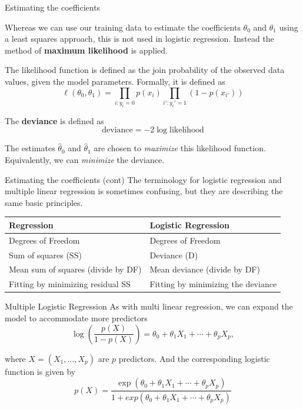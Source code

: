 \documentclass{beamer}
\begin{document}
\begin{frame}{Estimating the coefficients}
	
	Whereas we can use our training data to estimate the coefficients $\theta_0$ and $\theta_1$ using a least squares approach, this is not used in logistic regression. Instead the method of {\bf maximum likelihood} is applied. 
	
	The likelihood function is defined as the join probability of the observed data values, given the model parameters. Formally, it is defined as
	\begin{equation*}
		\ell (\theta_0,\theta_1)= \prod_{i:y_i=0} p(x_i) \prod_{i':y_i'=1} (1-p(x_{i'}))
	\end{equation*}	

The \textbf{deviance} is defined as 
\begin{equation*}
	\text{deviance}=-2 \log \text{likelihood}
\end{equation*}

The estimates $\hat{\theta}_0$ and $\hat{\theta}_1$  are chosen to {\it maximize} this likelihood function. Equivalently, we can \textit{minimize} the deviance.


\end{frame}		
\begin{frame}{Estimating the coefficients (cont)}
	The terminology for logistic regression and multiple linear regression is sometimes confusing, but they are describing the same basic principles.\\
\setlength{\parskip}{10pt}	
{\small
	\begin{tabular}{|l|l|}
		\hline
		Regression & Logistic Regression \\
		\hline
		Degrees of Freedom & Degrees of Freedom \\
		Sum of squares (SS) & Deviance (D)\\
		Mean sum of squares (divide by DF) & Mean deviance (divide by DF)\\
		Fitting by minimizing residual SS & Fitting by minimizing the deviance\\
		\hline
	\end{tabular}
}
\end{frame}	


\begin{frame}{Multiple Logistic Regression}
	As with multi linear regression, we can expand the model to accommodate more predictors
	\begin{equation*}
		\log \left( \frac{p(X)}{1-p(X)} \right) = \theta_0 + \theta_1 X_1 + \cdots+ \theta_p X_p,
	\end{equation*} 
	
	where $X=(X_1,\ldots,X_p)$ are $p$ predictors. And the corresponding logistic function is given by
	\begin{equation*}
		p(X)= \frac{\exp(\theta_0 + \theta_1 X_1 + \cdots+ \theta_p X_p)}{1 +exp(\theta_0 + \theta_1 X_1 + \cdots+ \theta_p X_p) }
	\end{equation*}
\end{frame}
\end{document}
